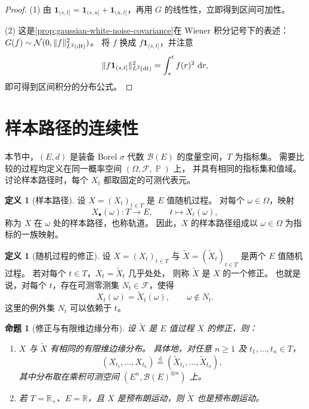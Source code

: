 \documentclass[UTF8,11pt,a4paper,oneside,fontset=fandol]{ctexrep}
\numberwithin{equation}{section}
\theoremstyle{plain}
\newtheorem{proposition}[theorem]{命题}
\theoremstyle{definition}
\newtheorem{definition}[theorem]{定义}
\theoremstyle{remark}
\newcommand{\R}{\mathbb{R}}
\newcommand{\B}{\mathcal{B}}
\newcommand{\F}{\mathcal{F}}
\DeclareMathOperator{\Prob}{\mathbb{P}}
\newcommand{\ind}[1]{\mathbf{1}_{#1}}
\newcommand{\dd}{\mathop{}\!\mathrm{d}}
\DeclarePairedDelimiter{\norm}{\lVert}{\rVert}
\begin{document}
\begin{proof}
(1) 由 $\ind{(s,t]}=\ind{(s,u]}+\ind{(u,t]}$，再用 $G$ 的线性性，立即得到区间可加性。

(2) 这是\cref{prop:gaussian-white-noise-covariance}在 Wiener 积分记号下的表述：
$G(f)\sim\mathcal{N}(0,\norm{f}_{L^2(\dd t)}^2)$。
将 $f$ 换成 $f\ind{(s,t]}$，并注意
\[
  \norm{f\ind{(s,t]}}_{L^2(\dd t)}^2
  =\int_s^t f(r)^2\,\dd r,
\]
即可得到区间积分的分布公式。
\end{proof}

\section{样本路径的连续性}
\label{sec:sample-path-continuity}

本节中，$(E,d)$ 是装备 Borel $\sigma$ 代数 $\B(E)$ 的度量空间，$T$ 为指标集。
需要比较的过程均定义在同一概率空间 $(\Omega,\F,\Prob)$ 上，
并具有相同的指标集和值域。讨论样本路径时，每个 $X_t$ 都取固定的可测代表元。

\begin{definition}[样本路径]
\label{def:sample-path}
设 $X=(X_t)_{t\in T}$ 是 $E$ 值随机过程。
对每个 $\omega\in\Omega$，映射
\[
  X_\bullet(\omega):T\longrightarrow E,\qquad
  t\longmapsto X_t(\omega),
\]
称为 $X$ 在 $\omega$ 处的样本路径，也称轨道。
因此，$X$ 的样本路径组成以 $\omega\in\Omega$ 为指标的一族映射。
\end{definition}

\begin{definition}[随机过程的修正]
\label{def:process-modification}
设 $X=(X_t)_{t\in T}$ 与 $\widetilde X=(\widetilde X_t)_{t\in T}$ 是两个 $E$ 值随机过程。
若对每个 $t\in T$，$X_t=\widetilde X_t$ 几乎处处，
则称 $\widetilde X$ 是 $X$ 的一个修正。
也就是说，对每个 $t$，存在可测零测集 $N_t\in\F$，使得
\[
  X_t(\omega)=\widetilde X_t(\omega),\qquad\omega\notin N_t.
\]
这里的例外集 $N_t$ 可以依赖于 $t$。
\end{definition}

\begin{proposition}[修正与有限维边缘分布]
\label{prop:modification-finite-dimensional-laws}
设 $\widetilde X$ 是 $E$ 值过程 $X$ 的修正，则：
\begin{enumerate}[label=(\arabic*)]
  \item $X$ 与 $\widetilde X$ 有相同的有限维边缘分布。
    具体地，对任意 $n\ge1$ 及 $t_1,\ldots,t_n\in T$，
    \[
      (X_{t_1},\ldots,X_{t_n})\overset{\mathrm d}{=}
      (\widetilde X_{t_1},\ldots,\widetilde X_{t_n}),
    \]
    其中分布取在乘积可测空间 $(E^n,\B(E)^{\otimes n})$ 上。
  \item 若 $T=\R_+$、$E=\R$，且 $X$ 是预布朗运动，则 $\widetilde X$ 也是预布朗运动。
\end{enumerate}
\end{proposition}
\end{document}
